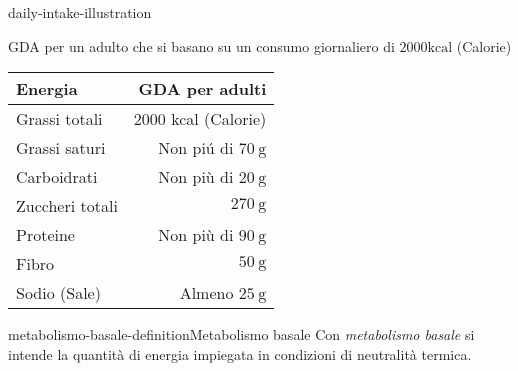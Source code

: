 \documentclass[preview]{standalone}
\begin{document}

\begin{snippet}{daily-intake-illustration}
    \begin{center}
    GDA per un adulto che si basano su un consumo giornaliero di $2000 \mathrm{kcal}$ (Calorie)
    \begin{tabular}{|l|r|}
    \hline Energia & GDA per adulti \\
    \hline Grassi totali & 2000 kcal (Calorie) \\
    \hline Grassi saturi & Non piú di $70 \mathrm{~g}$ \\
    \hline Carboidrati & Non più di $20 \mathrm{~g}$ \\
    \hline Zuccheri totali & $270 \mathrm{~g}$ \\
    \hline Proteine & Non più di $90 \mathrm{~g}$ \\
    \hline Fibro & $50 \mathrm{~g}$ \\
    \hline Sodio (Sale) & Almeno $25 \mathrm{~g}$ \\
    \hline
    \end{tabular}
    \end{center}
    \phantom{}
\end{snippet}


\begin{snippetdefinition}{metabolismo-basale-definition}{Metabolismo basale}
    Con \textit{metabolismo basale} si intende la quantità di energia impiegata in condizioni di neutralità termica.
\end{snippetdefinition}
\end{document}
